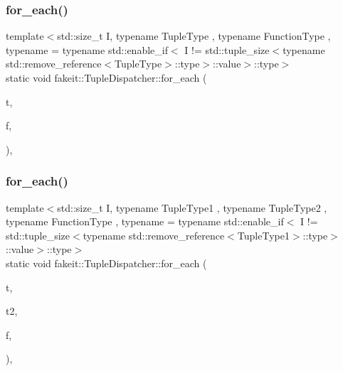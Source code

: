 \mbox{\label{structfakeit_1_1TupleDispatcher_afd32e025fbf695e16bb4b4ac1642c491}} 
\subsubsection{\texorpdfstring{for\_each()}{for\_each()}\hspace{0.1cm}{\footnotesize\ttfamily [22/54]}}
{\footnotesize\ttfamily template$<$std\+::size\+\_\+t I, typename Tuple\+Type , typename Function\+Type , typename  = typename std\+::enable\+\_\+if$<$            I != std\+::tuple\+\_\+size$<$typename std\+::remove\+\_\+reference$<$\+Tuple\+Type$>$\+::type$>$\+::value$>$\+::type$>$ \\
static void fakeit\+::\+Tuple\+Dispatcher\+::for\+\_\+each (\begin{DoxyParamCaption}\item[{Tuple\+Type \&\&}]{t,  }\item[{Function\+Type \&}]{f,  }\item[{std\+::integral\+\_\+constant$<$ size\+\_\+t, I $>$}]{ }\end{DoxyParamCaption})\hspace{0.3cm}{\ttfamily [inline]}, {\ttfamily [static]}}

\mbox{\label{structfakeit_1_1TupleDispatcher_a42566b7faaac776dc99492e7c0b973b3}} 
\subsubsection{\texorpdfstring{for\_each()}{for\_each()}\hspace{0.1cm}{\footnotesize\ttfamily [23/54]}}
{\footnotesize\ttfamily template$<$std\+::size\+\_\+t I, typename Tuple\+Type1 , typename Tuple\+Type2 , typename Function\+Type , typename  = typename std\+::enable\+\_\+if$<$            I != std\+::tuple\+\_\+size$<$typename std\+::remove\+\_\+reference$<$\+Tuple\+Type1$>$\+::type$>$\+::value$>$\+::type$>$ \\
static void fakeit\+::\+Tuple\+Dispatcher\+::for\+\_\+each (\begin{DoxyParamCaption}\item[{Tuple\+Type1 \&\&}]{t,  }\item[{Tuple\+Type2 \&\&}]{t2,  }\item[{Function\+Type \&}]{f,  }\item[{std\+::integral\+\_\+constant$<$ size\+\_\+t, I $>$}]{ }\end{DoxyParamCaption})\hspace{0.3cm}{\ttfamily [inline]}, {\ttfamily [static]}}

